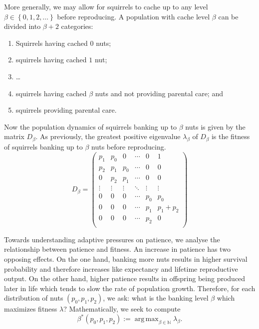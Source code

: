 \documentclass[titlepage, hidelinks, 12pt]{article}
\theoremstyle{plain}
\theoremstyle{remark}
\theoremstyle{definition}
\newcommand{\N}{\mathbb{N}}
\DeclareMathOperator*{\argmax}{arg\,max}
\begin{document}
More generally, we may allow for squirrels to cache up to any level $\beta\in\left\{ 0, 1, 2, \ldots \right\}$ before reproducing. A population with cache
level $\beta$ can be divided into $\beta+2$ categories:
\begin{enumerate}
    \item Squirrels having cached $0$ nuts;
    \item squirrels having cached $1$ nut;
    \item \dots
    \item squirrels having cached $\beta$ nuts and not providing parental care; and
    \item squirrels providing parental care. 
\end{enumerate}
Now the population dynamics of squirrels banking up to $\beta$ nuts is given by the matrix $D_\beta$. As previously, the greatest positive eigenvalue
$\lambda_\beta$ of $D_\beta$ is the fitness of squirrels banking up to $\beta$ nuts before reproducing. 
\begin{equation}
D_\beta =
\begin{pmatrix}
    p_1 & p_0 & 0 & \cdots & 0 & 1 \\
    p_2 & p_1 & p_0 & \cdots & 0 & 0 \\
    0 & p_2 & p_1 & \cdots & 0 & 0 \\
    \vdots & \vdots & \vdots & \ddots & \vdots & \vdots \\
    0 & 0 & 0 & \cdots & p_0 & p_0 \\ 
    0 & 0 & 0 & \cdots & p_1 & p_1 + p_2 \\ 
    0 & 0 & 0 & \cdots & p_2 & 0 \\ 

\end{pmatrix}
    \label{eqn:Dbeta}
\end{equation}

Towards understanding adaptive pressures on patience, we analyse the relationship between patience and fitness. An increase in patience has two
opposing effects. On the one hand, banking more nuts results in higher survival probability and therefore increases like expectancy and lifetime
reproductive output. On the other hand, higher patience results in offspring being produced later in life which tends to slow the rate of population
growth. Therefore, for each distribution of nuts $(p_0, p_1, p_2)$, we ask: what is the banking level $\beta$ which maximizes fitness $\lambda$? 
Mathematically, we seek to compute 
\begin{equation}
    \beta^*(p_0, p_1, p_2) := \argmax_{\beta\in\N} \lambda_\beta.
    \label{eqn:betastar}
\end{equation}
\end{document}
